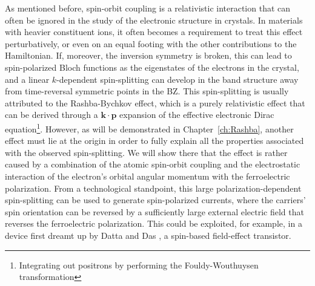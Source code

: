 As mentioned before, spin-orbit coupling is a relativistic interaction that can often be ignored in the study of the electronic structure in crystals.
In materials with heavier constituent ions, it often becomes a requirement to treat this effect perturbatively, or even on an equal footing with the other contributions to the Hamiltonian.
If, moreover, the inversion symmetry is broken, this can lead to spin-polarized Bloch functions as the eigenstates of the electrons in the crystal, and a linear $k$-dependent spin-splitting can develop in the band structure away from time-reversal symmetric points in the \gls{BZ}.
This spin-splitting is usually attributed to the Rashba-Bychkov effect, which is a purely relativistic effect that can be derived through a $\bm{k}\cdot \bm{p}$ expansion of the effective electronic Dirac equation\footnote{Integrating out positrons by performing the Fouldy-Wouthuysen transformation}.
However, as will be demonstrated in Chapter~\ref{ch:Rashba}, another effect must lie at the origin in order to fully explain  all the properties associated with the observed spin-splitting.
We will show there that the effect is rather caused by a combination of the atomic spin-orbit coupling and the electrostatic interaction of the electron's orbital angular momentum with the ferroelectric polarization.
From a technological standpoint, this large polarization-dependent spin-splitting can be used to generate spin-polarized currents, where the carriers' spin orientation can be reversed by a sufficiently large external electric field that reverses the ferroelectric polarization.
This could be exploited, for example, in a device first dreamt up by Datta and Das \cite{Datta1990}, a spin-based field-effect transistor.

